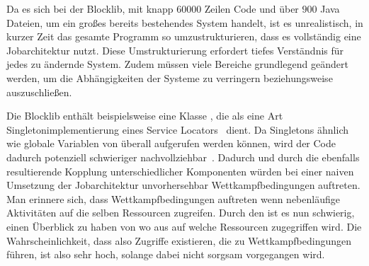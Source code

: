 Da es sich bei der Blocklib, mit knapp $60000$ Zeilen Code und über $900$ Java Dateien, um ein großes bereits bestehendes System handelt, ist es unrealistisch, in kurzer Zeit das gesamte Programm so umzustrukturieren, dass es vollständig eine Jobarchitektur nutzt. Diese Umstrukturierung erfordert tiefes Verständnis für jedes zu ändernde System. Zudem müssen viele Bereiche grundlegend geändert werden, um die Abhängigkeiten der Systeme zu verringern beziehungsweise auszuschließen.

Die Blocklib enthält beispielsweise eine Klasse , die als eine Art Singletonimplementierung eines Service Locators~\cite[S.~301~ff.]{Nystrom2015} dient. Da Singletons ähnlich wie globale Variablen von überall aufgerufen werden können, wird der Code dadurch potenziell schwieriger nachvollziehbar~\cite[S.~108]{Nystrom2015}. Dadurch und durch die ebenfalls resultierende Kopplung unterschiedlicher Komponenten würden bei einer naiven Umsetzung der Jobarchitektur unvorhersehbar Wettkampfbedingungen auftreten.
Man erinnere sich, dass Wettkampfbedingungen auftreten wenn nebenläufige Aktivitäten auf die selben Ressourcen zugreifen. Durch den  ist es nun schwierig, einen Überblick zu haben von wo aus auf welche Ressourcen zugegriffen wird. Die Wahrscheinlichkeit, dass also Zugriffe existieren, die zu Wettkampfbedingungen führen, ist also sehr hoch, solange dabei nicht sorgsam vorgegangen wird.

